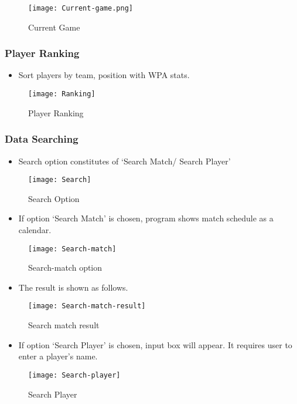 \documentclass[conference,compsoc, twocolumn]{IEEEtran}
\begin{document}
\begin{figure}[H]
\centering\texttt{[image: Current-game.png]}
\caption{Current Game}
\end{figure}

\subsubsection{Player Ranking}
\begin{itemize}
\item Sort players by team, position with WPA stats.
\end{itemize}

\begin{figure}[H]
\centering\texttt{[image: Ranking]}
\caption{Player Ranking}
\end{figure}

\subsubsection{Data Searching}
\begin{itemize}
\item Search option constitutes of  ‘Search Match/ Search Player’
\end{itemize}
\begin{figure}[H]
\centering\texttt{[image: Search]}
\caption{Search Option}
\end{figure}

\begin{itemize}
\item If option ‘Search Match’ is chosen, program shows match schedule as a calendar.
\end{itemize}
\begin{figure}[H]
\centering\texttt{[image: Search-match]}
\caption{Search-match option}
\end{figure}

\begin{itemize}
\item The result is shown as follows.
\end{itemize}
\begin{figure}[H]
\centering\texttt{[image: Search-match-result]}
\caption{Search match result}
\end{figure}

\begin{itemize}
\item If option ‘Search Player’ is chosen, input box will appear. It requires user to enter a player’s name.
\end{itemize}
\begin{figure}[H]
\centering\texttt{[image: Search-player]}
\caption{Search Player}
\end{figure}
\end{document}
